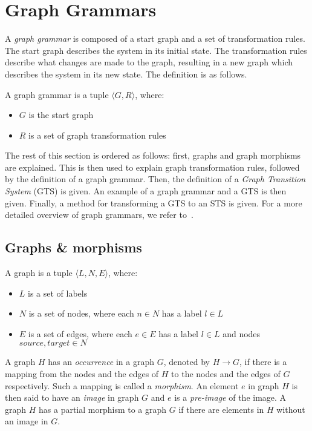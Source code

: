 \section{Graph Grammars}\label{sec:graph}
A \textit{graph grammar} is composed of a start graph and a set of transformation rules. The start graph describes the system in its initial state. The transformation rules describe what changes are made to the graph, resulting in a new graph which describes the system in its new state. The definition is as follows.
\vspace{5px}
\begin{definition}
A graph grammar is a tuple $\langle G, R\rangle$, where:
\begin{itemize}
  \item $G$ is the start graph
  \item $R$ is a set of graph transformation rules
\end{itemize}
\end{definition}

The rest of this section is ordered as follows: first, graphs and graph morphisms are explained. This is then used to explain graph transformation rules, followed by the definition of a graph grammar. Then, the definition of a \textit{Graph Transition System} (GTS) is given. An example of a graph grammar and a GTS is then given. Finally, a method for transforming a GTS to an STS is given. For a more detailed overview of graph grammars, we refer to~\cite{Rensink:graph_grammars, Heckel2006187, Andries1999}.

\subsection{Graphs \& morphisms}
\begin{definition}
A graph is a tuple $\langle L, N, E\rangle$, where:
\begin{itemize}
  \item $L$ is a set of labels
  \item $N$ is a set of nodes, where each $n \in N$ has a label $l \in L$
  \item $E$ is a set of edges, where each $e \in E$ has a label $l \in L$ and nodes $source,target \in N$
\end{itemize}
\end{definition}

A graph $H$ has an \textit{occurrence} in a graph $G$, denoted by $H \rightarrow G$, if there is a mapping from the nodes and the edges of $H$ to the nodes and the edges of $G$ respectively. Such a mapping is called a \textit{morphism}. An element $e$ in graph $H$ is then said to have an \textit{image} in graph $G$ and $e$ is a \textit{pre-image} of the image. A graph $H$ has a partial morphism to a graph $G$ if there are elements in $H$ without an image in $G$.

